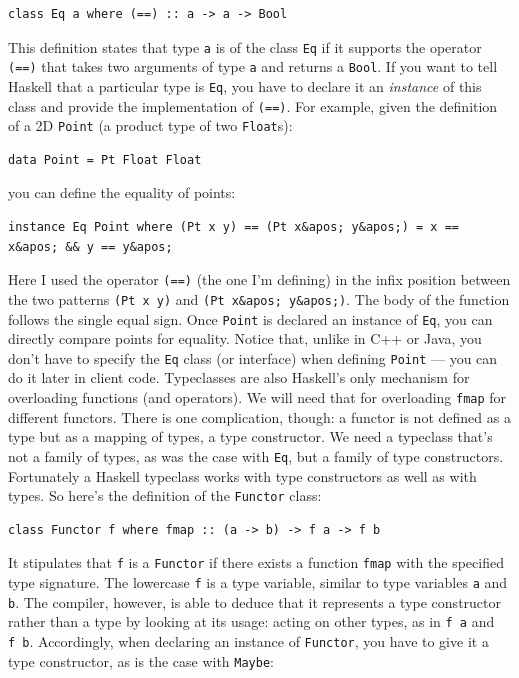 \begin{verbatim}
class Eq a where (==) :: a -> a -> Bool
\end{verbatim}

This definition states that type \texttt{a} is of the class \texttt{Eq}
if it supports the operator \texttt{(==)} that takes two arguments of
type \texttt{a} and returns a \texttt{Bool}. If you want to tell Haskell
that a particular type is \texttt{Eq}, you have to declare it an
\emph{instance} of this class and provide the implementation of
\texttt{(==)}. For example, given the definition of a 2D \texttt{Point}
(a product type of two \texttt{Float}s):

\begin{verbatim}
data Point = Pt Float Float
\end{verbatim}

you can define the equality of points:

\begin{verbatim}
instance Eq Point where (Pt x y) == (Pt x&apos; y&apos;) = x == x&apos; && y == y&apos;
\end{verbatim}

Here I used the operator \texttt{(==)} (the one I'm defining) in the
infix position between the two patterns \texttt{(Pt\ x\ y)} and
\texttt{(Pt\ x\&apos;\ y\&apos;)}. The body of the function follows the
single equal sign. Once \texttt{Point} is declared an instance of
\texttt{Eq}, you can directly compare points for equality. Notice that,
unlike in C++ or Java, you don't have to specify the \texttt{Eq} class
(or interface) when defining \texttt{Point} --- you can do it later in
client code. Typeclasses are also Haskell's only mechanism for
overloading functions (and operators). We will need that for overloading
\texttt{fmap} for different functors. There is one complication, though:
a functor is not defined as a type but as a mapping of types, a type
constructor. We need a typeclass that's not a family of types, as was
the case with \texttt{Eq}, but a family of type constructors.
Fortunately a Haskell typeclass works with type constructors as well as
with types. So here's the definition of the \texttt{Functor} class:

\begin{verbatim}
class Functor f where fmap :: (a -> b) -> f a -> f b
\end{verbatim}

It stipulates that \texttt{f} is a \texttt{Functor} if there exists a
function \texttt{fmap} with the specified type signature. The lowercase
\texttt{f} is a type variable, similar to type variables \texttt{a} and
\texttt{b}. The compiler, however, is able to deduce that it represents
a type constructor rather than a type by looking at its usage: acting on
other types, as in \texttt{f\ a} and \texttt{f\ b}. Accordingly, when
declaring an instance of \texttt{Functor}, you have to give it a type
constructor, as is the case with \texttt{Maybe}:

